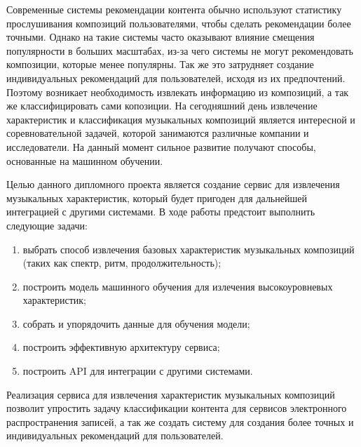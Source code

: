 Современные системы рекомендации контента обычно используют статистику прослушивания композиций пользователями, чтобы сделать рекомендации более точными. Однако на такие системы часто оказывают влияние смещения популярности в больших масштабах, из-за чего системы не могут рекомендовать композиции, которые менее популярны. Так же это затрудняет создание индивидуальных рекомендаций для пользователей, исходя из их предпочтений. Поэтому возникает необходимость извлекать информацию из композиций, а так же классифицировать сами копозиции. На сегодняшний день извлечение характеристик и классификация музыкальных композиций является интересной и соревновательной задачей, которой занимаются различные компании и исследователи. На данный момент сильное развитие получают способы, основанные на машинном обучении.


Целью данного дипломного проекта является создание сервис для извлечения музыкальных характеристик, который будет пригоден для дальнейшей интеграцией с другими системами. В ходе работы предстоит выполнить следующие задачи:
\begin{enumerate}
  \item выбрать способ извлечения базовых характеристик музыкальных \linebreak ком\-по\-зи\-ций (таких как спектр, ритм, продолжительность);
  \item построить модель машинного обучения для излечения высокоуровневых характеристик;
  \item собрать и упорядочить данные для обучения модели;
  \item построить эффективную архитектуру сервиса;
  \item построить API для интеграции с другими системами.
\end{enumerate}

Реализация сервиса для извлечения характеристик музыкальных композиций позволит упростить задачу классификации контента для сервисов электронного распространения записей, а так же создать систему для создания более точных и индивидуальных рекомендаций для пользователей.
